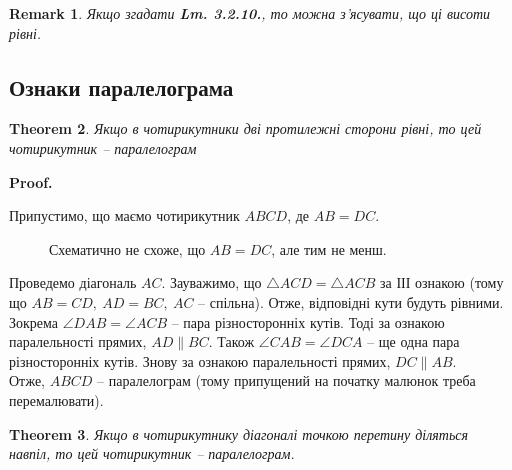 \documentclass[a4paper, 10pt]{article}
\makeatletter
\def\qed{$\blacksquare$}
\theoremstyle{theoremdd}
\newtheorem{theorem}{Theorem}[subsection]
\theoremstyle{theoremdd}
\theoremstyle{theoremdd}
\theoremstyle{theoremdd}
\theoremstyle{theoremdd}
\theoremstyle{theoremdd}
\theoremstyle{theoremdd}
\newtheorem{remark}[theorem]{Remark}
\theoremstyle{theoremdd}
\theoremstyle{theoremdd}
\renewenvironment{proof}[1][Proof.\\]{\par
\pushQED{\hfill \qed}%
\normalfont \topsep6\p@\@plus6\p@\relax
\trivlist
\item\relax
{\bfseries
#1\@addpunct{.}}\hspace\labelsep\ignorespaces
}{%
\popQED\endtrivlist\@endpefalse
}
\makeatother
\begin{document}
\begin{remark}
Якщо згадати \textbf{Lm. 3.2.10.}, то можна з'ясувати, що ці висоти рівні.
\end{remark}

\subsection{Ознаки паралелограма}
\begin{theorem}
Якщо в чотирикутники дві протилежні сторони рівні, то цей чотирикутник -- паралелограм
\end{theorem}

\begin{proof}
Припустимо, що маємо чотирикутник $ABCD$, де $AB = DC$.
\begin{figure}[H]
\centering
{}
\caption*{Схематично не схоже, що $AB = DC$, але тим не менш.}
\end{figure}
Проведемо діагональ $AC$. Зауважимо, що $\triangle ACD = \triangle ACB$ за ІІІ ознакою (тому що $AB = CD,\ AD = BC,\ AC$ -- спільна). Отже, відповідні кути будуть рівними. Зокрема $\angle DAB = \angle ACB$ -- пара різносторонніх кутів. Тоді за ознакою паралельності прямих, $AD \parallel BC$. Також $\angle CAB = \angle DCA$ -- ще одна пара різносторонніх кутів. Знову за ознакою паралельності прямих, $DC \parallel AB$.\\
Отже, $ABCD$ -- паралелограм (тому припущений на початку малюнок треба перемалювати).
\end{proof}

\begin{theorem}
Якщо в чотирикутнику діагоналі точкою перетину діляться навпіл, то цей чотирикутник -- паралелограм.
\end{theorem}
\end{document}
